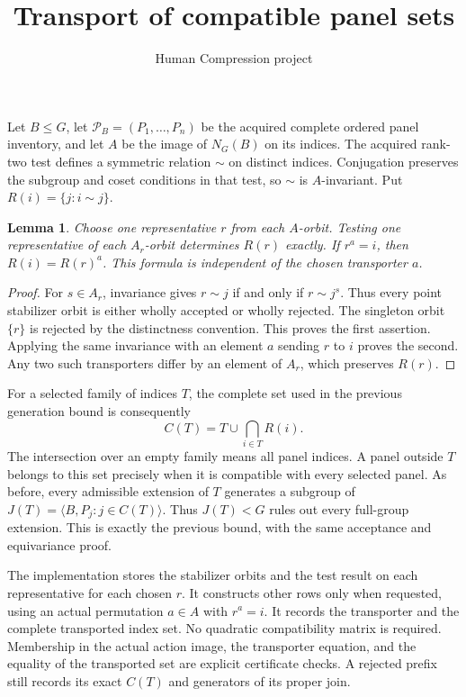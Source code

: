 \documentclass[11pt]{article}
\title{Transport of compatible panel sets}
\author{Human Compression project}\date{}
\newtheorem{lemma}{Lemma}
\begin{document}
\maketitle
Let $B\leq G$, let $\mathcal P_B=(P_1,\ldots,P_n)$ be the acquired
complete ordered panel inventory, and let $A$ be the image of $N_G(B)$
on its indices. The acquired rank-two test defines a symmetric relation
$\sim$ on distinct indices. Conjugation preserves the subgroup and coset
conditions in that test, so $\sim$ is $A$-invariant. Put
$R(i)=\{j:i\sim j\}$.

\begin{lemma}
Choose one representative $r$ from each $A$-orbit. Testing one representative
of each $A_r$-orbit determines $R(r)$ exactly. If $r^a=i$, then
$R(i)=R(r)^a$. This formula is independent of the chosen transporter $a$.
\end{lemma}
\begin{proof}
For $s\in A_r$, invariance gives $r\sim j$ if and only if $r\sim j^s$.
Thus every point stabilizer orbit is either wholly accepted or wholly
rejected. The singleton orbit $\{r\}$ is rejected by the distinctness
convention. This proves the first assertion. Applying the same invariance
with an element $a$ sending $r$ to $i$ proves the second. Any two such
transporters differ by an element of $A_r$, which preserves $R(r)$.
\end{proof}

For a selected family of indices $T$, the complete set used in the
previous generation bound is consequently
\[
 C(T)=T\cup\bigcap_{i\in T}R(i).
\]
The intersection over an empty family means all panel indices. A panel
outside $T$ belongs to this set precisely when it is compatible with
every selected panel. As before, every admissible extension of $T$
generates a subgroup of $J(T)=\langle B,P_j:j\in C(T)\rangle$.
Thus $J(T)<G$ rules out every full-group extension. This is exactly the
previous bound, with the same acceptance and equivariance proof.

The implementation stores the stabilizer orbits and the test result on
each representative for each chosen $r$. It constructs other rows only
when requested, using an actual permutation $a\in A$ with $r^a=i$.
It records the transporter and the complete transported index set.
No quadratic compatibility matrix is required. Membership in the actual
action image, the transporter equation, and the equality of the
transported set are explicit certificate checks. A rejected prefix still
records its exact $C(T)$ and generators of its proper join.
\end{document}
